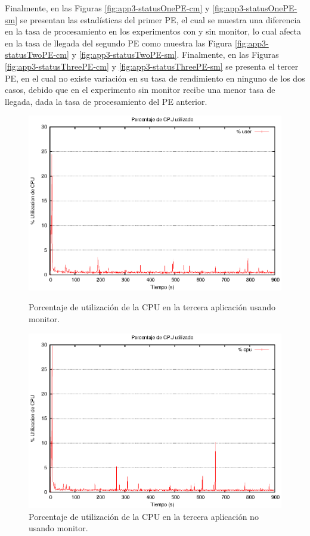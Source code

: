 Finalmente, en las Figuras \ref{fig:app3-statusOnePE-cm} y \ref{fig:app3-statusOnePE-sm} se presentan las estadísticas del primer PE, el cual se muestra una diferencia en la tasa de procesamiento en los experimentos con y sin monitor, lo cual afecta en la tasa de llegada del segundo PE como muestra las Figura \ref{fig:app3-statusTwoPE-cm} y \ref{fig:app3-statusTwoPE-sm}. Finalmente, en las Figuras \ref{fig:app3-statusThreePE-cm} y \ref{fig:app3-statusThreePE-sm} se presenta el tercer PE, en el cual no existe variación en su tasa de rendimiento en ninguno de los dos casos, debido que en el experimento sin monitor recibe una menor tasa de llegada, dada la tasa de procesamiento del PE anterior.

\begin{figure}[!hptb]
\centering

\begin{minipage}[c]{0.45\textwidth}
\centering
    \includegraphics[width=\textwidth]{images/exp/app3/cm/fisical/consumeCPU.eps}
    \caption{Porcentaje de utilización de la CPU en la tercera aplicación usando monitor.}
    \label{fig:app3-consumeCPU-cm}
\end{minipage} \hspace*{1cm}
\begin{minipage}[c]{0.45\textwidth}
\centering
    \includegraphics[width=\textwidth]{images/exp/app3/sm/fisical/consumeCPU.eps}
    \caption{Porcentaje de utilización de la CPU en la tercera aplicación no usando monitor.}
    \label{fig:app3-consumeCPU-sm}
\end{minipage}


\end{figure}
